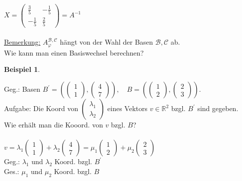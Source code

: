 \documentclass[a4paper,11pt]{article}
\newtheorem{bsp}[definition]{Beispiel}
\begin{document}
$X=\begin{pmatrix}\frac{3}{5} & -\frac{1}{5} \\ -\frac{1}{5} & \frac{2}{5}\end{pmatrix}=A^{-1}$ \\
\\
\underline{Bemerkung:}
$A^{\mathcal{B},\mathcal{C}}_\varphi$ hängt von der Wahl der Basen $\mathcal{B},\mathcal{C}$ ab. \\
Wie kann man einen Basiswechsel berechnen?

\begin{bsp}
\end{bsp}
Geg.: Basen $B^\prime=\left(\begin{pmatrix}1\\1\end{pmatrix},\begin{pmatrix}4\\7\end{pmatrix}\right),\quad B=\left(\begin{pmatrix}1\\2\end{pmatrix},\begin{pmatrix}2\\3\end{pmatrix}\right)$. \\
Aufgabe: Die Koord von $\begin{pmatrix}\lambda_1\\\lambda_2\end{pmatrix}$ eines Vektors $v\in\mathbb{R}^2$ bzgl. $B^\prime$ sind gegeben. \\
Wie erhält man die Kooord. von $v$ bzgl. $B$? \\
\\
$v=\lambda_1\begin{pmatrix}1\\1\end{pmatrix}+\lambda_2\begin{pmatrix}4\\7\end{pmatrix}=\mu_1\begin{pmatrix}1\\2\end{pmatrix}+\mu_2\begin{pmatrix}2\\3\end{pmatrix}$ \\
Geg.: $\lambda_1$ und $\lambda_2$ Koord. bzgl. $B^\prime$ \\
Ges.: $\mu_1$ und $\mu_2$ Koord. bzgl. $B$ \\
\end{document}
